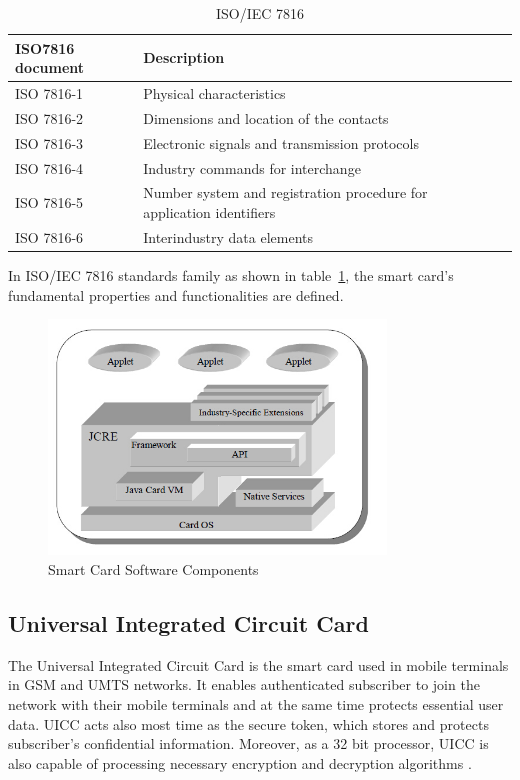\begin{table}[!htb]
\caption{ISO/IEC 7816 \cite{handbuch}}
\centering
\begin{tabular}{lllll}
 ISO7816 document & Description  \\[1ex]
\hline\hline
 ISO 7816-1&Physical characteristics   \\
ISO 7816-2&Dimensions and location of the contacts   \\
 ISO 7816-3& Electronic signals and transmission protocols   \\
ISO 7816-4&Industry commands for interchange  \\
ISO 7816-5& Number system and registration procedure for application identifiers \\
ISO 7816-6& Interindustry data elements  \\
\hline
\end{tabular}
\label{table:ISO7816}
\end{table}

In ISO/IEC 7816 standards family as shown in table~\ref{table:ISO7816}, the smart card's fundamental properties and functionalities are defined.

\begin{figure}[!htbp]
	\centering
	\includegraphics[width=0.8\textwidth]{scc.jpg}
		\caption{Smart Card Software Components \cite{jcadg}}
	\label{fig:scc}
\end{figure}

\subsection{Universal Integrated Circuit Card}
The Universal Integrated Circuit Card is the smart card used in mobile terminals in GSM and UMTS networks. It enables authenticated subscriber to join the network with their mobile terminals and at the same time protects essential user data. UICC acts  also most time as the secure token, which stores and protects subscriber's confidential information. Moreover, as a 32 bit processor, UICC is also capable of processing necessary  encryption and  decryption algorithms \cite{uiccDef}.

